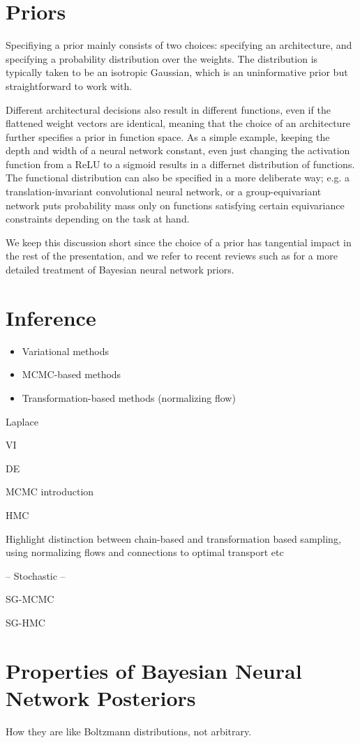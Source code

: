 \section{Priors}

Specifiying a prior mainly consists of two choices: specifying an architecture, and specifying a probability distribution over the weights. The distribution is typically taken to be an isotropic Gaussian, which is an uninformative prior but straightforward to work with. 

Different architectural decisions also result in different functions, even if the flattened weight vectors are identical, meaning that the choice of an architecture further specifies a prior in function space. As a simple example, keeping the depth and width of a neural network constant, even just changing the activation function from a ReLU to a sigmoid results in a differnet distribution of functions. The functional distribution can also be specified in a more deliberate way; e.g. a translation-invariant convolutional neural network, or a group-equivariant network \citep{cohenGroupEquivariantConvolutional2016} puts probability mass only on functions satisfying certain equivariance constraints depending on the task at hand. 

We keep this discussion short since the choice of a prior has tangential impact in the rest of the presentation, and we refer to recent reviews such as \citep{fortuinPriorsBayesianDeep2022} for a more detailed treatment of Bayesian neural network priors. 

\section{Inference} \label{section:bayesian_inference}

\begin{itemize}
    \item Variational methods
    \item MCMC-based methods
    \item Transformation-based methods (normalizing flow)
\end{itemize}

Laplace

VI

DE

MCMC introduction

HMC

Highlight distinction between chain-based and transformation based sampling, using normalizing flows and connections to optimal transport etc 

-- Stochastic -- 

SG-MCMC

SG-HMC

\section{Properties of Bayesian Neural Network Posteriors} \label{section:bayesian_properties}

How they are like Boltzmann distributions, not arbitrary. 